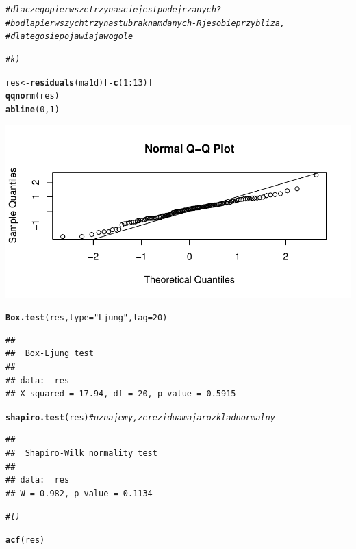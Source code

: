 \documentclass[10pt,a4paper,noindentfirst]{article}\usepackage[]{graphicx}\usepackage[]{color}
\makeatletter
\def\maxwidth{ %
  \ifdim\Gin@nat@width>\linewidth
    \linewidth
  \else
    \Gin@nat@width
  \fi
}
\newcommand{\hlnum}[1]{\textcolor[rgb]{0.686,0.059,0.569}{#1}}%
\newcommand{\hlstr}[1]{\textcolor[rgb]{0.192,0.494,0.8}{#1}}%
\newcommand{\hlcom}[1]{\textcolor[rgb]{0.678,0.584,0.686}{\textit{#1}}}%
\newcommand{\hlopt}[1]{\textcolor[rgb]{0,0,0}{#1}}%
\newcommand{\hlstd}[1]{\textcolor[rgb]{0.345,0.345,0.345}{#1}}%
\newcommand{\hlkwb}[1]{\textcolor[rgb]{0.69,0.353,0.396}{#1}}%
\newcommand{\hlkwc}[1]{\textcolor[rgb]{0.333,0.667,0.333}{#1}}%
\newcommand{\hlkwd}[1]{\textcolor[rgb]{0.737,0.353,0.396}{\textbf{#1}}}%
\newenvironment{kframe}{%
 \def\at@end@of@kframe{}%
 \ifinner\ifhmode%
  \def\at@end@of@kframe{\end{minipage}}%
  \begin{minipage}{\columnwidth}%
 \fi\fi%
 \def\FrameCommand##1{\hskip\@totalleftmargin \hskip-\fboxsep
 \colorbox{shadecolor}{##1}\hskip-\fboxsep
     \hskip-\linewidth \hskip-\@totalleftmargin \hskip\columnwidth}%
 \MakeFramed {\advance\hsize-\width
   \@totalleftmargin\z@ \linewidth\hsize
   \@setminipage}}%
 {\par\unskip\endMakeFramed%
 \at@end@of@kframe}
\newenvironment{knitrout}{}{} %
\makeatother
\begin{document}
\begin{knitrout}
\begin{kframe}\begin{alltt}
\hlcom{# dlaczego pierwsze trzynascie jest podejrzanych? }
\hlcom{# bo dla pierwszych trzynastu brak nam danych - R je sobie przybliza, }
\hlcom{# dlatego sie pojawiaja w ogole}

\hlcom{# k)}

\hlstd{res} \hlkwb{<-} \hlkwd{residuals}\hlstd{(ma1d)[}\hlopt{-}\hlkwd{c}\hlstd{(}\hlnum{1}\hlopt{:}\hlnum{13}\hlstd{)]}
\hlkwd{qqnorm}\hlstd{(res)}
\hlkwd{abline}\hlstd{(}\hlnum{0}\hlstd{,}\hlnum{1}\hlstd{)}
\end{alltt}
\end{kframe}

{\centering \includegraphics[width=\maxwidth]{figure/unnamed-chunk-110} 

}


\begin{kframe}\begin{alltt}
\hlkwd{Box.test}\hlstd{(res,}\hlkwc{type}\hlstd{=}\hlstr{"Ljung"}\hlstd{,}\hlkwc{lag}\hlstd{=}\hlnum{20}\hlstd{)}
\end{alltt}
\begin{verbatim}
## 
## 	Box-Ljung test
## 
## data:  res
## X-squared = 17.94, df = 20, p-value = 0.5915
\end{verbatim}
\begin{alltt}
\hlkwd{shapiro.test}\hlstd{(res)}   \hlcom{# uznajemy, ze rezidua maja rozklad normalny}
\end{alltt}
\begin{verbatim}
## 
## 	Shapiro-Wilk normality test
## 
## data:  res
## W = 0.982, p-value = 0.1134
\end{verbatim}
\begin{alltt}
\hlcom{# l)}

\hlkwd{acf}\hlstd{(res)}
\end{alltt}
\end{kframe}


\end{knitrout}
\end{document}

